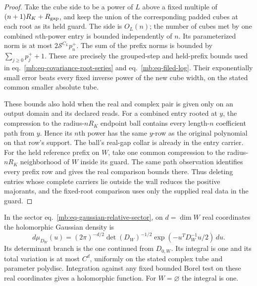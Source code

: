 \documentclass[11pt,letterpaper,reqno]{amsart}
\makeatletter
\numberwithin{equation}{section}
\renewcommand{\eqref}[1]{\textup{eq.~\ref{#1}}}
\theoremstyle{definition}
\newcommand{\ms@majorstart}{%
  \pushQED{\qed}\renewcommand{\qedsymbol}{$\blacksquare\square$}}
\newenvironment{corollary}[1][]{\ms@majorstart\ms@corollary[#1]}
  {\popQED\endms@corollary}
\theoremstyle{remark}
\makeatother
\begin{document}
\begin{proof}
Take the cube side to be a power of \(L\) above a fixed multiple of \((n+1)R_K+R_{\rm gap}\), and keep the union of the corresponding padded cubes at each root as its held guard. The side is \(O_L(n)\); the number of cubes met by one combined \(n\)th-power entry is bounded independently of \(n\). Its parameterized norm is at most \(2\mathcal S^{C_L}p_n^+\). The sum of the prefix norms is bounded by \(\sum_{j\ge0}p_j^++1\). These are precisely the grouped-step and held-prefix bounds used in \eqref{mb:eq-covariance-root-series} and \eqref{mb:eq-filed-log}. Their exponentially small error beats every fixed inverse power of the new cube width, on the stated common smaller absolute tube.

These bounds also hold when the real and complex pair is given only on an output domain and its declared reads. For a combined entry rooted at \(y\), the compression to the radius-\(nR_K\) endpoint ball contains every length-\(n\) coefficient path from \(y\). Hence its \(n\)th power has the same \(y\)-row as the original polynomial on that row's support. The ball's real-gap collar is already in the entry carrier. For the held reference prefix on \(W\), take one common compression to the radius-\(nR_K\) neighborhood of \(W\) inside its guard. The same path observation identifies every prefix row and gives the real comparison bounds there. Thus deleting entries whose complete carriers lie outside the wall reduces the positive majorants, and the fixed-root comparison uses only the supplied real data in the guard.
\end{proof}

\begin{corollary}[Normalized local Gaussian]
\label{mb:cor-complex-gaussian}
In the sector \eqref{mb:eq-gaussian-relative-sector}, on \(d=\dim W\) real coordinates the holomorphic Gaussian density is
\[
 d\mu_{D_W}(u)
    =(2\pi)^{-d/2}\det(D_W)^{-1/2}
                       \exp(-u^TD_W^{-1}u/2)\,du .
\]
Its determinant branch is the one continued from \(D_{0,W}\). Its integral is one and its total variation is at most \(C^d\), uniformly on the stated complex tube and parameter polydisc. Integration against any fixed bounded Borel test on these real coordinates gives a holomorphic function. For \(W=\varnothing\) the integral is one.
\end{corollary}
\end{document}

